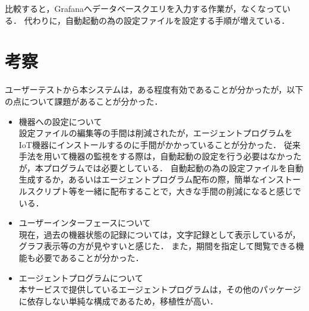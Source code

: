 比較すると，Grafanaへデータベースクエリを入力する作業が，なくなっている．
代わりに，自動起動の為の設定ファイルを設定する手順が増えている．

\section{考察}
ユーザーテストから本システムは，ある程度有効であることが分かったが，以下の点について課題があることが分かった．
\begin{itemize}
\item 機器への設定について\\
	設定ファイルの編集等の手間は削減されたが，エージェントプログラムをIoT機器にインストールするのに手間がかかっていることが分かった．
	従来手法を用いて機器の監視をする際は，自動起動の設定を行う必要はなかったが，本プログラムでは必要としている．
	自動起動の為の設定ファイルを自動生成するか，あるいはエージェントプログラム配布の際，簡単なインストールスクリプト等を一緒に配布することで，大きな手間の削減になると感じでいる．
\item ユーザーインターフェースについて\\
	現在，過去の機器状態の記録については，文字記録として表示しているが，グラフ表示等の方が見やすいと感じた．
	また，期間を指定して閲覧できる機能も必要であることが分かった．
\item エージェントプログラムについて\\
	本サービスで提供しているエージェントプログラムは，その他のパッケージに依存しない単純な構成であるため，移植性が高い．
\end{itemize}


